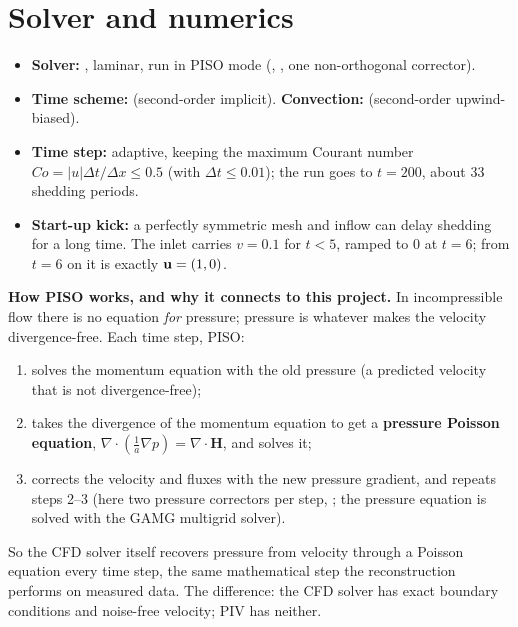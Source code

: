 \section{Solver and numerics}
\begin{itemize}
\item \textbf{Solver:} , laminar, run in PISO mode (, , one non-orthogonal corrector).
\item \textbf{Time scheme:}  (second-order implicit). \textbf{Convection:}  (second-order upwind-biased).
\item \textbf{Time step:} adaptive, keeping the maximum Courant number $Co=|u|\Delta t/\Delta x\le0.5$ (with $\Delta t\le0.01$); the run goes to $t=200$, about 33 shedding periods.
\item \textbf{Start-up kick:} a perfectly symmetric mesh and inflow can delay shedding for a long time. The inlet carries $v=0.1$ for $t<5$, ramped to 0 at $t=6$; from $t=6$ on it is exactly $\mathbf{u}=(1,0)$.
\end{itemize}

\textbf{How PISO works, and why it connects to this project.} In incompressible flow there is no equation \emph{for} pressure; pressure is whatever makes the velocity divergence-free. Each time step, PISO:
\begin{enumerate}
\item solves the momentum equation with the old pressure (a predicted velocity that is not divergence-free);
\item takes the divergence of the momentum equation to get a \textbf{pressure Poisson equation}, $\nabla\cdot(\tfrac1a\nabla p)=\nabla\cdot\mathbf H$, and solves it;
\item corrects the velocity and fluxes with the new pressure gradient, and repeats steps 2--3 (here two pressure correctors per step, ; the pressure equation is solved with the GAMG multigrid solver).
\end{enumerate}
So the CFD solver itself recovers pressure from velocity through a Poisson equation every time step, the same mathematical step the reconstruction performs on measured data. The difference: the CFD solver has exact boundary conditions and noise-free velocity; PIV has neither.

